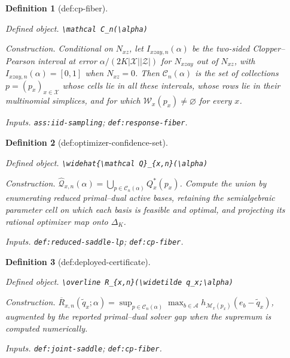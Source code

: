 \documentclass{article}
\newtheorem{definition}{Definition}
\begin{document}
\begin{definition}[def:cp-fiber]\label{def:cp-fiber}
\par\smallskip\noindent\emph{Defined object.} \texttt{\textbackslash{}\allowbreak{}mathcal C\_\allowbreak{}n(\textbackslash{}\allowbreak{}alpha)}
\par\smallskip\noindent\emph{Construction.} Conditional on \(N_{xz}\), let \(I_{xzay,n}(\alpha)\) be the two-sided Clopper--Pearson interval at error \(\alpha/(2K|\mathcal X||\mathcal Z|)\) for \(N_{xzay}\) out of \(N_{xz}\), with \(I_{xzay,n}(\alpha)=[0,1]\) when \(N_{xz}=0\). Then \(\mathcal C_n(\alpha)\) is the set of collections \(p=(p_x)_{x\in\mathcal X}\) whose cells lie in all these intervals, whose rows lie in their multinomial simplices, and for which \(\mathcal W_x(p_x)\neq\varnothing\) for every \(x\).
\par\smallskip\noindent\emph{Inputs.} \texttt{ass:\allowbreak{}iid-\allowbreak{}sampling}; \texttt{def:\allowbreak{}response-\allowbreak{}fiber}.
\end{definition}

\begin{definition}[def:optimizer-confidence-set]\label{def:optimizer-confidence-set}
\par\smallskip\noindent\emph{Defined object.} \texttt{\textbackslash{}\allowbreak{}widehat\{\textbackslash{}\allowbreak{}mathcal Q\}\allowbreak{}\_\allowbreak{}\{x,\allowbreak{}n\}\allowbreak{}(\textbackslash{}\allowbreak{}alpha)}
\par\smallskip\noindent\emph{Construction.} \(\widehat{\mathcal Q}_{x,n}(\alpha)=\bigcup_{p\in\mathcal C_n(\alpha)}Q_x^*(p_x)\). Compute the union by enumerating reduced primal--dual active bases, retaining the semialgebraic parameter cell on which each basis is feasible and optimal, and projecting its rational optimizer map onto \(\Delta_K\).
\par\smallskip\noindent\emph{Inputs.} \texttt{def:\allowbreak{}reduced-\allowbreak{}saddle-\allowbreak{}lp}; \texttt{def:\allowbreak{}cp-\allowbreak{}fiber}.
\end{definition}

\begin{definition}[def:deployed-certificate]\label{def:deployed-certificate}
\par\smallskip\noindent\emph{Defined object.} \texttt{\textbackslash{}\allowbreak{}overline R\_\allowbreak{}\{x,\allowbreak{}n\}\allowbreak{}(\textbackslash{}\allowbreak{}widetilde q\_\allowbreak{}x;\allowbreak{}\textbackslash{}\allowbreak{}alpha)}
\par\smallskip\noindent\emph{Construction.} \(\overline R_{x,n}(\widetilde q_x;\alpha)=\sup_{p\in\mathcal C_n(\alpha)}\max_{b\in\mathcal A}h_{\mathcal M_x(p_x)}(e_b-\widetilde q_x)\), augmented by the reported primal--dual solver gap when the supremum is computed numerically.
\par\smallskip\noindent\emph{Inputs.} \texttt{def:\allowbreak{}joint-\allowbreak{}saddle}; \texttt{def:\allowbreak{}cp-\allowbreak{}fiber}.
\end{definition}
\end{document}
